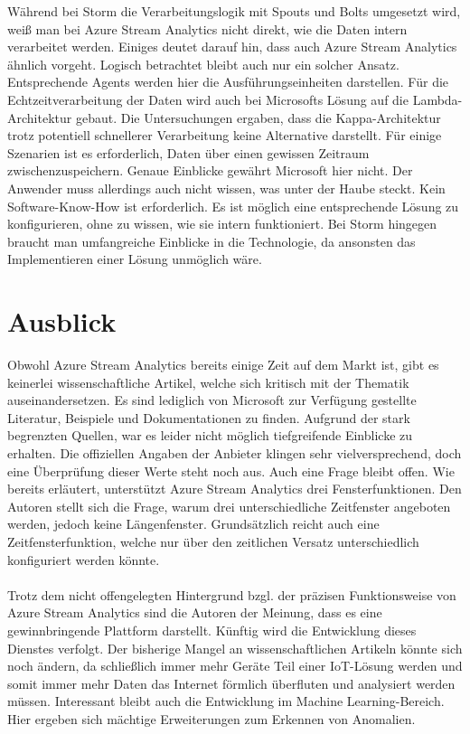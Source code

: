 Während bei Storm die Verarbeitungslogik mit Spouts und Bolts umgesetzt wird, weiß man bei Azure Stream Analytics nicht direkt, wie die Daten intern verarbeitet werden. Einiges deutet darauf hin, dass auch Azure Stream Analytics ähnlich vorgeht. Logisch betrachtet bleibt auch nur ein solcher Ansatz. Entsprechende Agents werden hier die Ausführungseinheiten darstellen. Für die Echtzeitverarbeitung der Daten wird auch bei Microsofts Lösung auf die Lambda-Architektur gebaut. Die Untersuchungen ergaben, dass die Kappa-Architektur trotz potentiell schnellerer Verarbeitung keine Alternative darstellt. Für einige Szenarien ist es erforderlich, Daten über einen gewissen Zeitraum zwischenzuspeichern. Genaue Einblicke gewährt Microsoft hier nicht. Der Anwender muss allerdings auch nicht wissen, was unter der Haube steckt. Kein Software-Know-How ist erforderlich. Es ist möglich eine entsprechende Lösung zu konfigurieren, ohne zu wissen, wie sie intern funktioniert. Bei Storm hingegen braucht man umfangreiche Einblicke in die Technologie, da ansonsten das Implementieren einer Lösung unmöglich wäre.

\section{Ausblick}
Obwohl Azure Stream Analytics bereits einige Zeit auf dem Markt ist, gibt es keinerlei wissenschaftliche Artikel, welche sich kritisch mit der Thematik auseinandersetzen. Es sind lediglich von Microsoft zur Verfügung gestellte Literatur, Beispiele und Dokumentationen zu finden. Aufgrund der stark begrenzten Quellen, war es leider nicht möglich tiefgreifende Einblicke zu erhalten. Die offiziellen Angaben der Anbieter klingen sehr vielversprechend, doch eine Überprüfung dieser Werte steht noch aus. Auch eine Frage bleibt offen. Wie bereits erläutert, unterstützt Azure Stream Analytics drei Fensterfunktionen. Den Autoren stellt sich die Frage, warum drei unterschiedliche Zeitfenster angeboten werden, jedoch keine Längenfenster. Grundsätzlich reicht auch eine Zeitfensterfunktion, welche nur über den zeitlichen Versatz unterschiedlich konfiguriert werden könnte. \\ \\
Trotz dem nicht offengelegten Hintergrund bzgl. der präzisen Funktionsweise von Azure Stream Analytics sind die Autoren der Meinung, dass es eine gewinnbringende Plattform darstellt. Künftig wird die Entwicklung dieses Dienstes verfolgt. Der bisherige Mangel an wissenschaftlichen Artikeln könnte sich noch ändern, da schließlich immer mehr Geräte Teil einer IoT-Lösung werden und somit immer mehr Daten das Internet förmlich überfluten und analysiert werden müssen. Interessant bleibt auch die Entwicklung im Machine Learning-Bereich. Hier ergeben sich mächtige Erweiterungen zum Erkennen von Anomalien.\\




\ifCLASSOPTIONcaptionsoff
  \newpage
\fi
